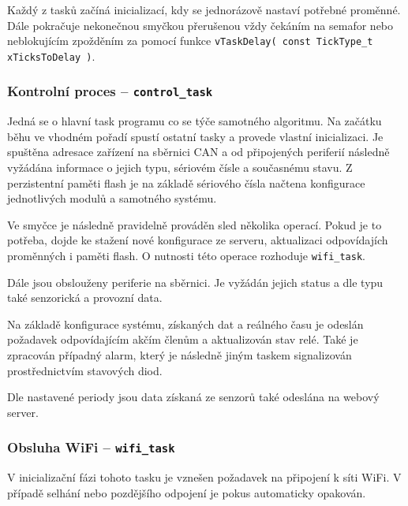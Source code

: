         Každý z tasků začíná inicializací, kdy se jednorázově nastaví potřebné proměnné. Dále pokračuje nekonečnou smyčkou přerušenou vždy čekáním na semafor nebo neblokujícím zpožděním za pomocí funkce \texttt{vTaskDelay( const TickType\_t xTicksToDelay )}.

        
        \subsubsection{Kontrolní proces -- \texttt{control\_task}}
            Jedná se o hlavní task programu co se týče samotného algoritmu. Na začátku běhu ve vhodném pořadí spustí ostatní tasky a provede vlastní inicializaci. Je spuštěna adresace zařízení na sběrnici CAN a od připojených periferií následně vyžádána informace o jejich typu, sériovém čísle a současnému stavu. Z perzistentní paměti flash je na základě sériového čísla načtena konfigurace jednotlivých modulů a samotného systému. 

            Ve smyčce je následně pravidelně prováděn sled několika operací. Pokud je to potřeba, dojde ke stažení nové konfigurace ze serveru, aktualizaci odpovídajích proměnných i paměti flash.  O nutnosti této operace rozhoduje \texttt{wifi\_task}.

            Dále jsou obslouženy periferie na sběrnici. Je vyžádán jejich status a dle typu také senzorická a provozní data. 

            Na základě konfigurace systému, získaných dat a reálného času je odeslán požadavek odpovídajícím akčím členům a aktualizován stav relé. Také je zpracován případný alarm, který je následně jiným taskem signalizován prostřednictvím stavových diod. 

            Dle nastavené periody jsou data získaná ze senzorů také odeslána na webový server.

        \subsubsection{Obsluha WiFi --  \texttt{wifi\_task}}
            V inicializační fázi tohoto tasku je vznešen požadavek na připojení k síti WiFi. V případě selhání nebo pozdějšího odpojení je pokus automaticky opakován. 
            
